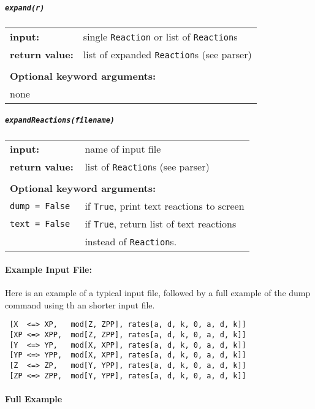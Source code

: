 \subparagraph{\tt expand(r)\\}

\begin{tabular}{ll}
\textbf{input:} & single {\tt Reaction} or list of {\tt Reaction}s \\
\textbf{return value:}& list of expanded {\tt Reaction}s (see parser) \\  \\
\multicolumn{2}{l}{\textbf{Optional keyword arguments:}} \\
none
\end{tabular}


\subparagraph{\tt expandReactions(filename)\\}

\begin{tabular}{ll}
\textbf{input:} & name of input file \\
\textbf{return value:}& list of {\tt Reaction}s (see parser) \\  \\
\multicolumn{2}{l}{\textbf{Optional keyword arguments:}}\\
\tt{dump = False} & if {\tt True}, print text reactions to screen \\
\tt{text = False} & if {\tt True}, return list of text reactions\\
& instead of {\tt Reaction}s.
\end{tabular}

\paragraph{Example Input File:}

Here is an example of a typical input file, followed by a full example of the dump command using th  an shorter input file.

\begin{lstlisting} 
 [X  <=> XP,   mod[Z, ZPP], rates[a, d, k, 0, a, d, k]]
 [XP <=> XPP,  mod[Z, ZPP], rates[a, d, k, 0, a, d, k]]
 [Y  <=> YP,   mod[X, XPP], rates[a, d, k, 0, a, d, k]] 
 [YP <=> YPP,  mod[X, XPP], rates[a, d, k, 0, a, d, k]] 
 [Z  <=> ZP,   mod[Y, YPP], rates[a, d, k, 0, a, d, k]]
 [ZP <=> ZPP,  mod[Y, YPP], rates[a, d, k, 0, a, d, k]]
\end{lstlisting}

\paragraph{Full Example}


